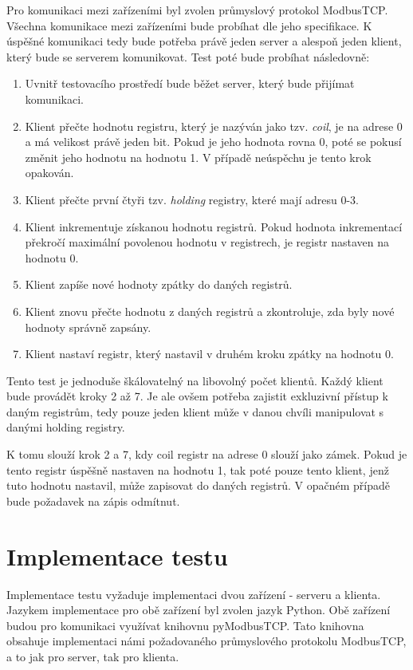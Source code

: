 Pro komunikaci mezi zařízeními byl zvolen průmyslový protokol ModbusTCP. Všechna komunikace mezi zařízeními bude probíhat dle jeho specifikace. K úspěšné komunikaci tedy bude potřeba právě jeden server a alespoň jeden klient, který bude se serverem komunikovat. Test poté bude probíhat následovně:

\begin{enumerate}
    \item Uvnitř testovacího prostředí bude běžet server, který bude přijímat komunikaci.
    \item Klient přečte hodnotu registru, který je nazýván jako tzv. \textit{coil}, je na adrese 0 a má velikost právě jeden bit. Pokud je jeho hodnota rovna 0, poté se pokusí změnit jeho hodnotu na hodnotu 1. V případě neúspěchu je tento krok opakován.
    \item Klient přečte první čtyři tzv. \textit{holding} registry, které mají adresu 0-3. 
    \item Klient inkrementuje získanou hodnotu registrů. Pokud hodnota inkrementací překročí maximální povolenou hodnotu v registrech, je registr nastaven na hodnotu 0.
    \item Klient zapíše nové hodnoty zpátky do daných registrů.
    \item Klient znovu přečte hodnotu z daných registrů a zkontroluje, zda byly nové hodnoty správně zapsány.
    \item Klient nastaví registr, který nastavil v druhém kroku zpátky na hodnotu 0.
\end{enumerate}

Tento test je jednoduše škálovatelný na libovolný počet klientů. Každý klient bude provádět kroky 2 až 7. Je ale ovšem potřeba zajistit exkluzivní přístup k daným registrům, tedy pouze jeden klient může v danou chvíli manipulovat s danými holding registry. 

K tomu slouží krok 2 a 7, kdy coil registr na adrese 0 slouží jako zámek. Pokud je tento registr úspěšně nastaven na hodnotu 1, tak poté pouze tento klient, jenž tuto hodnotu nastavil, může zapisovat do daných registrů. V opačném případě bude požadavek na zápis odmítnut.

\section{Implementace testu}\label{sec:python_test_impl}

Implementace testu vyžaduje implementaci dvou zařízení - serveru a klienta. Jazykem implementace pro obě zařízení byl zvolen jazyk Python. Obě zařízení budou pro komunikaci využívat knihovnu pyModbusTCP. Tato knihovna obsahuje implementaci námi požadovaného průmyslového protokolu ModbusTCP, a to jak pro server, tak pro klienta.
 
